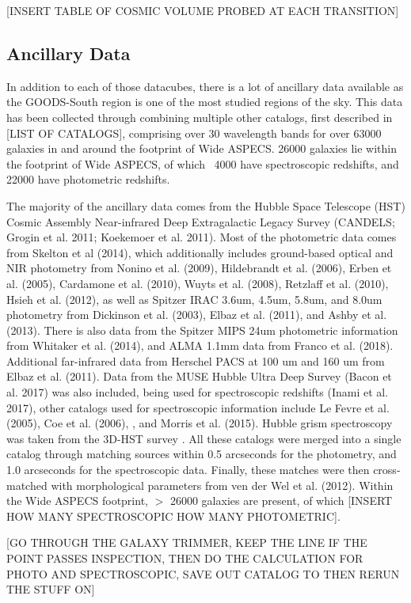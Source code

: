[INSERT TABLE OF COSMIC VOLUME PROBED AT EACH TRANSITION]

\subsection{Ancillary Data}

In addition to each of those datacubes, there is a lot of ancillary data available as the GOODS-South region is one of the most studied regions of the sky. This data has been collected through combining multiple other catalogs, first described in [LIST OF CATALOGS], comprising over 30 wavelength bands for over 63000 galaxies in and around the footprint of Wide ASPECS. 26000 galaxies lie within the footprint of Wide ASPECS, of which ~4000 have spectroscopic redshifts, and 22000 have photometric redshifts. 

The majority of the ancillary data comes from the Hubble Space Telescope (HST) Cosmic Assembly Near-infrared Deep Extragalactic Legacy Survey (CANDELS; Grogin et al. 2011; Koekemoer et al. 2011). Most of the photometric data comes from Skelton et al (2014), which additionally includes ground-based optical and NIR photometry from Nonino et al. (2009), Hildebrandt et al. (2006), Erben et al. (2005), Cardamone et al. (2010), Wuyts et al. (2008), Retzlaff et al. (2010), Hsieh et al. (2012), as well as Spitzer IRAC 3.6um, 4.5um, 5.8um, and 8.0um photometry from Dickinson et al. (2003), Elbaz et al. (2011), and Ashby et al. (2013). There is also data from the Spitzer MIPS 24um photometric information from Whitaker et al. (2014), and ALMA 1.1mm data from Franco et al. (2018). Additional far-infrared data from Herschel PACS at 100 um and 160 um from Elbaz et al. (2011). Data from the MUSE Hubble Ultra Deep Survey (Bacon et al. 2017) was also included, being used for spectroscopic redshifts (Inami et al. 2017), other catalogs used for spectroscopic information include Le Fevre et al. (2005), Coe et al. (2006), \cite{skelton20143d}, and Morris et al. (2015). Hubble grism spectroscopy was taken from the 3D-HST survey \cite{momcheva20163d}.  All these catalogs were merged into a single catalog through matching sources within 0.5 arcseconds for the photometry, and 1.0 arcseconds for the spectroscopic data. Finally, these matches were then cross-matched with morphological parameters from ven der Wel et al. (2012). Within the Wide ASPECS footprint, $>$ 26000 galaxies are present, of which [INSERT HOW MANY SPECTROSCOPIC HOW MANY PHOTOMETRIC].

[GO THROUGH THE GALAXY TRIMMER, KEEP THE LINE IF THE POINT PASSES INSPECTION, THEN DO THE CALCULATION FOR PHOTO AND SPECTROSCOPIC, SAVE OUT CATALOG TO THEN RERUN THE STUFF ON]


